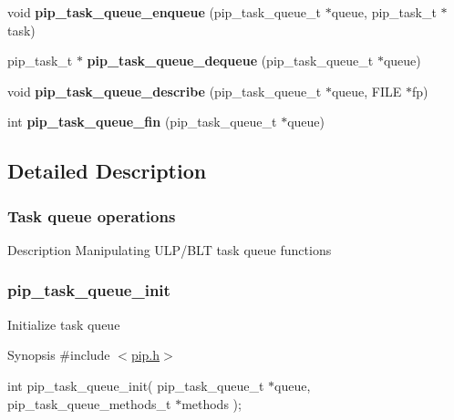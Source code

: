\begin{DoxyCompactItemize}
\item 
\hypertarget{group__ulp-1-task-queue_gae0f80336f51c43c3da988dd0467453cf}{void {\bfseries pip\-\_\-task\-\_\-queue\-\_\-enqueue} (pip\-\_\-task\-\_\-queue\-\_\-t $\ast$queue, pip\-\_\-task\-\_\-t $\ast$task)}\label{group__ulp-1-task-queue_gae0f80336f51c43c3da988dd0467453cf}

\item 
\hypertarget{group__ulp-1-task-queue_ga943bace202c72533951df9fc43f62277}{pip\-\_\-task\-\_\-t $\ast$ {\bfseries pip\-\_\-task\-\_\-queue\-\_\-dequeue} (pip\-\_\-task\-\_\-queue\-\_\-t $\ast$queue)}\label{group__ulp-1-task-queue_ga943bace202c72533951df9fc43f62277}

\item 
\hypertarget{group__ulp-1-task-queue_ga7fdea4628abd0c38779276b6cd8ebd3f}{void {\bfseries pip\-\_\-task\-\_\-queue\-\_\-describe} (pip\-\_\-task\-\_\-queue\-\_\-t $\ast$queue, F\-I\-L\-E $\ast$fp)}\label{group__ulp-1-task-queue_ga7fdea4628abd0c38779276b6cd8ebd3f}

\item 
\hypertarget{group__ulp-1-task-queue_ga45d0eaa7122e459ea19187c148b9da10}{int {\bfseries pip\-\_\-task\-\_\-queue\-\_\-fin} (pip\-\_\-task\-\_\-queue\-\_\-t $\ast$queue)}\label{group__ulp-1-task-queue_ga45d0eaa7122e459ea19187c148b9da10}

\end{DoxyCompactItemize}


\subsection{Detailed Description}
\hypertarget{ulp-task-queue}{}\subsubsection{Task queue operations}\label{ulp-task-queue}
\begin{DoxyParagraph}{Description}
Manipulating U\-L\-P/\-B\-L\-T task queue functions 
\end{DoxyParagraph}
\hypertarget{pip_task_queue_init}{}\subsubsection{pip\-\_\-task\-\_\-queue\-\_\-init}\label{pip_task_queue_init}
Initialize task queue

\begin{DoxyParagraph}{Synopsis}
\#include $<$\hyperlink{pip_8h_source}{pip.\-h}$>$ \par
 int pip\-\_\-task\-\_\-queue\-\_\-init( pip\-\_\-task\-\_\-queue\-\_\-t $\ast$queue, pip\-\_\-task\-\_\-queue\-\_\-methods\-\_\-t $\ast$methods );
\end{DoxyParagraph}

